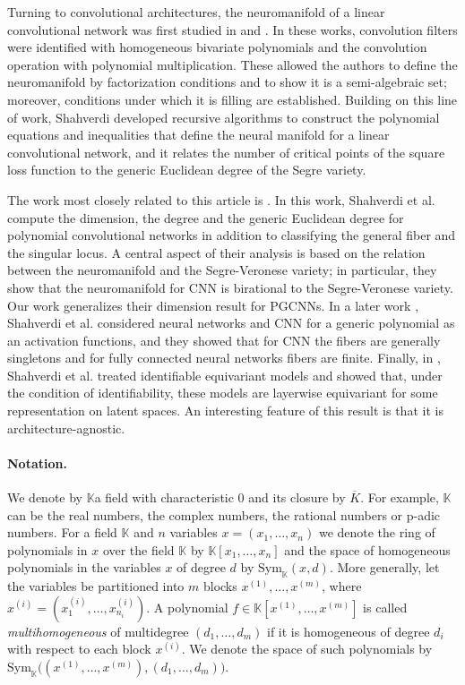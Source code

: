 \documentclass[final]{article}
\newcommand{\K}{\mathbb{K}}
\newcommand{\Sym}{\text{Sym}}
\theoremstyle{definition}
\theoremstyle{plain}
\begin{document}
Turning to convolutional architectures, the neuromanifold of a linear convolutional network was first studied in \cite{kohn2022geometrylinearconvolutionalnetworks} and \cite{kohn2024functionspacecriticalpoints}. 
In these works, convolution filters were identified with homogeneous bivariate polynomials and the convolution operation with polynomial multiplication. These allowed the authors to define the neuromanifold by factorization conditions and to show it is a semi-algebraic set; moreover, conditions under which it is filling are established.
Building on this line of work, Shahverdi \cite{shahverdi2024algebraiccomplexityneurovarietylinear} developed recursive algorithms to construct the polynomial equations and inequalities that define the neural manifold for a linear convolutional network, and it relates the number of critical points of the square loss function to the generic Euclidean degree of the Segre variety.

The work most closely related to this article is \cite{shahverdi2024geometryoptimizationpolynomialconvolutional}. In this work, Shahverdi et al. compute the dimension, the degree and the generic Euclidean degree for polynomial convolutional  networks in addition to classifying the general fiber and the singular locus. A central aspect of their analysis is based on the relation between  the neuromanifold and the Segre-Veronese variety; in particular, they show that the neuromanifold for CNN is birational to the Segre-Veronese variety.
Our work generalizes their dimension result for PGCNNs. 
In a later work \cite{shahverdi2026learning}, Shahverdi et al. considered neural networks and CNN for a generic polynomial as an activation functions, and they showed that for CNN the fibers are generally singletons and for fully connected neural networks fibers are finite.
Finally, in \cite{shahverdi2026identifiableequivariantnetworkslayerwise}, Shahverdi et al. treated identifiable equivariant models and showed that, under the condition of identifiability, these models are layerwise equivariant for some representation on latent spaces. 
An interesting feature of this result is that it is architecture-agnostic.



\paragraph{Notation.} We denote by $\K$a field with characteristic $0$ and its closure by $\overline{K}$.
For example, $\K$ can be the real numbers, the complex numbers, the rational numbers or p-adic numbers. 
For a field $\K$ and $n$ variables $x =(x_1, \dots, x_{n})$ we denote the ring of polynomials in $x$ over the field $\K$ by $\K[x_1, \dots, x_{n}]$ and the space of homogeneous polynomials in the variables $x$ of degree $d$ by $\Sym_\K(x, d)$. 
More generally, let the variables be partitioned into $m$ blocks $x^{(1)},\dots,x^{(m)}$, where $x^{(i)}=(x^{(i)}_1,\dots,x^{(i)}_{n_i})$. 
A polynomial $f \in \K[x^{(1)},\dots,x^{(m)}]$ is called \emph{multihomogeneous} of multidegree $(d_1,\dots,d_m)$ if it is homogeneous of degree $d_i$ with respect to each block $x^{(i)}$. 
We denote the space of such polynomials by $\Sym_\K\bigl((x^{(1)},\dots,x^{(m)}),(d_1,\dots,d_m)\bigr)$.
\end{document}
